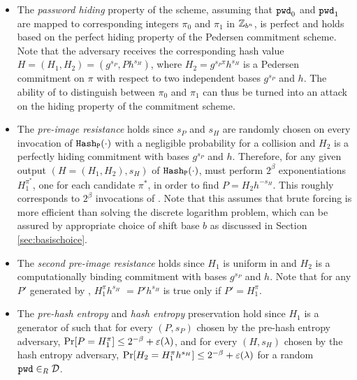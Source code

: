 \begin{itemize}
  \item The \emph{password hiding} property of the scheme, assuming that $\mathtt{pwd}_0$ and $\mathtt{pwd}_1$ are mapped to corresponding integers $\pi_0$ and $\pi_1$ in $\mathbb{Z}_{b^n}$, is perfect and holds based on the perfect hiding property of the Pedersen commitment scheme. 
    Note that the adversary receives the corresponding hash value $H=(H_1, H_2)=(g^{s_P}, Ph^{s_H})$, where $H_2= g^{s_P\pi}h^{s_H}$ is a Pedersen commitment on $\pi$ with respect to two independent bases $g^{s_P}$ and $h$. 
    The ability of \cA to distinguish between $\pi_0$ and $\pi_1$ can thus be turned into an attack on the hiding property of the commitment scheme.

  \item The \emph{pre-image resistance} holds since $s_P$ and $s_H$ are randomly chosen on every invocation of $\mathtt{Hash_P}(\cdot)$ with a negligible probability for a collision and $H_2$ is a perfectly hiding commitment with bases $g^{s_P}$ and $h$. 
    Therefore, for any given output $(H=(H_1, H_2), s_H)$ of $\mathtt{Hash_P}(\cdot)$, \cA must perform $2^\beta$ exponentiations $H_1^{\pi^\ast}$, one for each candidate $\pi^\ast$, in order to find $P = H_2h^{-s_H}$. 
    This roughly corresponds to $2^\beta$ invocations of \PPreHash.
    Note that this assumes that brute forcing \cD is more efficient than solving the discrete logarithm problem, which can be assured by appropriate choice of shift base $b$ as discussed in Section \ref{sec:basischoice}.

  \item The \emph{second pre-image resistance} holds since $H_1$ is uniform in \GG and $H_2$ is a computationally binding commitment with bases $g^{s_P}$ and $h$. 
    Note that for any $P'$ generated by \cA, $H_1^\pi h^{s_H}$ $=P'h^{s_H}$ is true only if $P'=H_1^\pi$.
	
	\item The \emph{pre-hash entropy} and \emph{hash entropy} preservation hold since $H_1$ is a generator of \GG such that for every $(P,s_P)$ chosen by the pre-hash entropy adversary, $\Pr[P=H_1^\pi]\leq2^{-\beta}+\varepsilon(\lambda)$, and for every $(H,s_H)$ chosen by the hash entropy adversary, $\Pr[H_2=H_1^\pi h^{s_H}]\leq2^{-\beta}+\varepsilon(\lambda)$ for a random $\mathtt{pwd}\in_R\mathcal{D}$.
\end{itemize}

